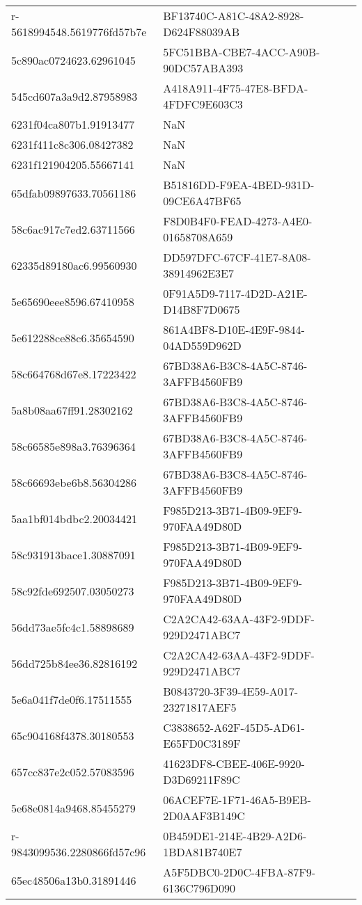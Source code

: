 \begin{tabular}{ll}
r-5618994548.5619776fd57b7e & BF13740C-A81C-48A2-8928-D624F88039AB \\
5c890ac0724623.62961045 & 5FC51BBA-CBE7-4ACC-A90B-90DC57ABA393 \\
545cd607a3a9d2.87958983 & A418A911-4F75-47E8-BFDA-4FDFC9E603C3 \\
6231f04ca807b1.91913477 & NaN \\
6231f411c8c306.08427382 & NaN \\
6231f121904205.55667141 & NaN \\
65dfab09897633.70561186 & B51816DD-F9EA-4BED-931D-09CE6A47BF65 \\
58c6ac917c7ed2.63711566 & F8D0B4F0-FEAD-4273-A4E0-01658708A659 \\
62335d89180ac6.99560930 & DD597DFC-67CF-41E7-8A08-38914962E3E7 \\
5e65690eee8596.67410958 & 0F91A5D9-7117-4D2D-A21E-D14B8F7D0675 \\
5e612288ce88c6.35654590 & 861A4BF8-D10E-4E9F-9844-04AD559D962D \\
58c664768d67e8.17223422 & 67BD38A6-B3C8-4A5C-8746-3AFFB4560FB9 \\
5a8b08aa67ff91.28302162 & 67BD38A6-B3C8-4A5C-8746-3AFFB4560FB9 \\
58c66585e898a3.76396364 & 67BD38A6-B3C8-4A5C-8746-3AFFB4560FB9 \\
58c66693ebe6b8.56304286 & 67BD38A6-B3C8-4A5C-8746-3AFFB4560FB9 \\
5aa1bf014bdbc2.20034421 & F985D213-3B71-4B09-9EF9-970FAA49D80D \\
58c931913bace1.30887091 & F985D213-3B71-4B09-9EF9-970FAA49D80D \\
58c92fde692507.03050273 & F985D213-3B71-4B09-9EF9-970FAA49D80D \\
56dd73ae5fc4c1.58898689 & C2A2CA42-63AA-43F2-9DDF-929D2471ABC7 \\
56dd725b84ee36.82816192 & C2A2CA42-63AA-43F2-9DDF-929D2471ABC7 \\
5e6a041f7de0f6.17511555 & B0843720-3F39-4E59-A017-23271817AEF5 \\
65c904168f4378.30180553 & C3838652-A62F-45D5-AD61-E65FD0C3189F \\
657cc837e2c052.57083596 & 41623DF8-CBEE-406E-9920-D3D69211F89C \\
5e68e0814a9468.85455279 & 06ACEF7E-1F71-46A5-B9EB-2D0AAF3B149C \\
r-9843099536.2280866fd57c96 & 0B459DE1-214E-4B29-A2D6-1BDA81B740E7 \\
65ec48506a13b0.31891446 & A5F5DBC0-2D0C-4FBA-87F9-6136C796D090 \\

\end{tabular}
